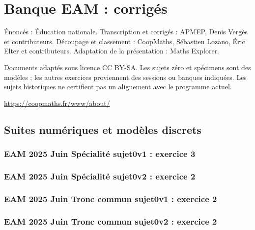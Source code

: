\documentclass[lang=fr,edition=teacher,layout=sheet]{mxbook}
\begin{document}
\chapter*{Banque EAM : corrigés}
Énoncés : Éducation nationale. Transcription et corrigés : APMEP, Denis Vergès et contributeurs. Découpage et classement : CoopMaths, Sébastien Lozano, Éric Elter et contributeurs. Adaptation de la présentation : Maths Explorer.\par\medskip
\noindent Documents adaptés sous licence CC BY-SA. Les sujets zéro et spécimens sont des modèles ; les autres exercices proviennent des sessions ou banques indiquées. Les sujets historiques ne certifient pas un alignement avec le programme actuel.
\par\smallskip\url{https://coopmaths.fr/www/about/}
\clearpage\section*{Suites numériques et modèles discrets}
\subsection*{EAM 2025 Juin Spécialité sujet0v1 : exercice 3}
\begingroup\endgroup
\par\bigskip
{}\subsection*{EAM 2025 Juin Spécialité sujet0v2 : exercice 2}
\begingroup\endgroup
\par\bigskip
{}\subsection*{EAM 2025 Juin Tronc commun sujet0v1 : exercice 2}
\begingroup\endgroup
\par\bigskip
{}\subsection*{EAM 2025 Juin Tronc commun sujet0v2 : exercice 2}
\begingroup\endgroup
\end{document}
